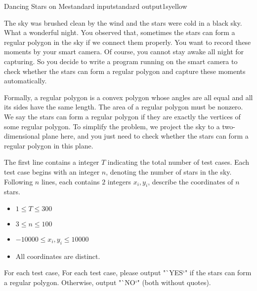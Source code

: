 \begin{problem}{Dancing Stars on Me}{standard input}{standard output}{1s}{yellow}

The sky was brushed clean by the wind and the stars were cold in a black sky. What a wonderful night.
You observed that, sometimes the stars can form a regular polygon in the sky if we connect them properly.
You want to record these moments by your smart camera.
Of course, you cannot stay awake all night for capturing.
So you decide to write a program running on the smart camera to check whether the stars can form a regular polygon and capture these moments automatically.

Formally, a regular polygon is a convex polygon whose angles are all equal and all its sides have the same length. The area of a regular polygon must be nonzero.
We say the stars can form a regular polygon if they are exactly the vertices of some regular polygon.
To simplify the problem, we project the sky to a two-dimensional plane here,
and you just need to check whether the stars can form a regular polygon in this plane.

\InputFile
The first line contains a integer $T$ indicating the total number of test cases.
Each test case begins with an integer $n$, denoting the number of stars in the sky.
Following $n$ lines, each contains $2$ integers $x_i, y_i$, describe the coordinates of $n$ stars.
\begin{itemize}
\item $1 \le T \le 300$
\item $3 \le n \le 100$
\item $-10000 \le x_i, y_i \le 10000$
\item All coordinates are distinct.
\end{itemize}

\OutputFile
For each test case, 
For each test case, please output "`YES`" if the stars can form a regular polygon. Otherwise, output "`NO`" (both without quotes).

\Example

\begin{example}
%
\end{example}
\end{problem}